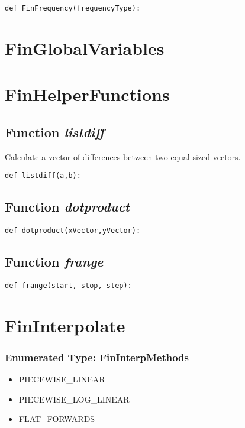 \documentclass[twoside,11pt]{book}
\begin{document}
\begin{lstlisting}
def FinFrequency(frequencyType):
\end{lstlisting}

\newpage
\section{FinGlobalVariables}

\newpage
\section{FinHelperFunctions}

\subsection{Function {\it listdiff}}
Calculate a vector of differences between two equal sized vectors. 

\begin{lstlisting}
def listdiff(a,b):
\end{lstlisting}

\subsection{Function {\it dotproduct}}


\begin{lstlisting}
def dotproduct(xVector,yVector):
\end{lstlisting}

\subsection{Function {\it frange}}


\begin{lstlisting}
def frange(start, stop, step):
\end{lstlisting}

\newpage
\section{FinInterpolate}

\subsubsection{Enumerated Type: FinInterpMethods}
\begin{itemize}
\item{PIECEWISE\_LINEAR}
\item{PIECEWISE\_LOG\_LINEAR}
\item{FLAT\_FORWARDS}
\end{itemize}
\end{document}
